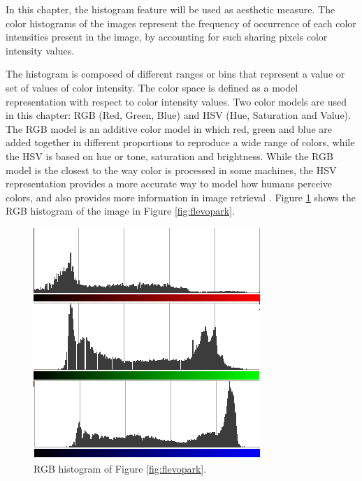 
In this chapter, the histogram feature will be used as aesthetic measure.
The color histograms of 
the images represent the frequency of occurrence of each color
intensities present in the image, by accounting for such sharing
pixels color intensity values. %

The histogram is composed of different ranges or bins that represent a value or set of values of color intensity. %
 The color space is defined as a model representation with respect to color intensity values. Two color models are used in this chapter: RGB (Red, Green, Blue) and HSV (Hue, Saturation and Value). The RGB model is an additive color model in which red, green and blue are added together in different proportions to reproduce a wide range of colors, while the HSV is based on hue or tone, saturation and brightness. While the RGB model is the closest to the way color is processed in some machines, the HSV representation provides a more accurate way to model how humans perceive colors, and also provides more information in image retrieval \cite{COLORDIFFERENCES}.
Figure \ref{fig:histogram} shows the RGB histogram of the image in Figure \ref{fig:flevopark}.

\begin{figure}
\centering
   \includegraphics[scale =0.6] {gfx/art/histogram.png}
\caption{RGB histogram of Figure \ref{fig:flevopark}. }
\label{fig:histogram}
\end{figure}


